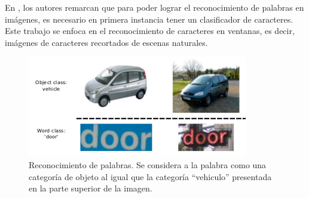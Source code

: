 	En \cite{wang}, los autores remarcan que para poder lograr el reconocimiento de palabras en imágenes, es necesario en primera instancia tener un clasificador de caracteres. Este trabajo se enfoca en el reconocimiento de caracteres en ventanas, es decir, imágenes de caracteres recortados de escenas naturales. 
	
	
	
	\begin{figure}[htbp]
		\centering
		\centerline{ \includegraphics[scale=0.7]{img/object_recognition.png} }
		\caption[Reconocimiento generico de objetos]{Reconocimiento de palabras. Se considera a la palabra como una categoría de objeto al igual que la categoría ``vehiculo'' presentada en la parte superior de la imagen.}
		\label{fig: Reconocimiento generico}
	\end{figure}
